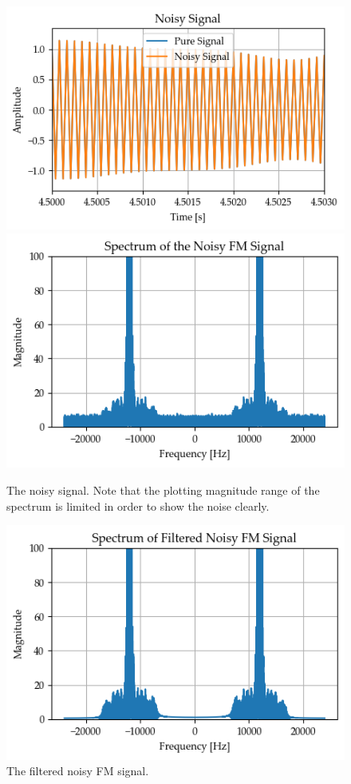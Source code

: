 \documentclass[../ECE459FinalProjectReport.tex]{subfiles}
\begin{document}
\begin{figure}[b]
    \centering
    \includegraphics[width=0.49\linewidth]{plots/am/noisy_time.png}
    \includegraphics[width=0.49\linewidth]{plots/am/noisy_spectrum.png}
    \caption{The noisy signal. Note that the plotting magnitude range of the spectrum is limited in order to show the noise clearly.}
    \label{fig:noisy-am}
\end{figure}
\begin{figure}[b]
    \centering
    \includegraphics[width=0.6\linewidth]{plots/am/noisy_spectrum_filtered.png}
    \caption{The filtered noisy FM signal.}
    \label{fig:noisy-am-filtered}
\end{figure}
\end{document}
